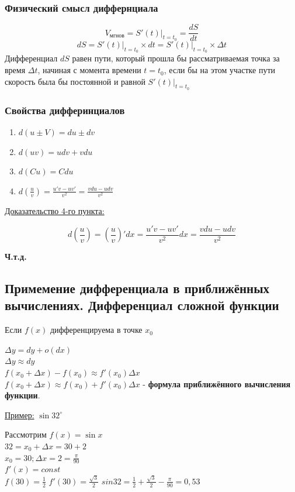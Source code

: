 \documentclass[12pt]{article}
\begin{document}
    \subsubsection*{Физический смысл диффернциала}
    \[V_{\text{мгнов}}=S'(t)\Big|_{t=t_0}=\frac{dS}{dt}\]
    \[ dS = S'(t)\Big|_{t=t_0} \times dt = S'(t)\Big|_{t=t_0} \times \Delta t \]
    Дифференциал $dS$ равен пути, который прошла бы рассматриваемая точка за время $\Delta t$, начиная с момента времени $t=t_0$, если бы на этом участке пути скорость была бы постоянной и равной $S'(t)\Big|_{t=t_0}$
    \subsubsection*{Свойства дифферинциалов}
    \begin{enumerate}
        \item $d(u \pm V)=du \pm dv$
        \item $d(uv)=udv+vdu$
        \item $d(Cu)=Cdu$
        \item $d(\frac{u}{v})=\frac{u'v-uv'}{v^2}=\frac{vdu-udv}{v^2}$
    \end{enumerate} 
    \underline{Доказательство 4-го пункта:}
    \begin{adjustwidth}{1.5em}{1.5em}
        \[d\left(\frac{u}{v}\right)=\left(\frac{u}{v}\right)'dx=\frac{u'v-uv'}{v^2}dx=\frac{vdu-udv}{v^2}\]
        \begin{center}
            \textbf{Ч.т.д.}
        \end{center}
    \end{adjustwidth}
    \subsection{Примемение дифференциала в приближённых вычислениях. Дифференциал сложной функции}
    \noindent Если $f(x)$ дифференцируема в точке $x_0$
    \begin{adjustwidth}{1.5em}{1.5em}
        $\Delta y=dy+o(dx)$\\
        $\Delta y \approx dy$\\
        $f(x_0+\Delta x)-f(x_0) \approx f'(x_0) \Delta x$\\
        $f(x_0+\Delta x) \approx f(x_0)+f'(x_0) \Delta x$ - \textbf{формула приближённого вычисления функции}.
    \end{adjustwidth}
    \underline{Пример:} $\sin 32^\circ$
    \begin{adjustwidth}{1.5em}{1.5em}
        Рассмотрим $f(x)=\sin x$\\
        $32 = x_0+\Delta x=30 + 2$\\
        $x_0=30;\Delta x = 2 = \frac{\pi}{90}$\\
        $f'(x)=const$\\
        $f(30)=\frac{1}{2}$
        $f'(30)=\frac{\sqrt{3}}{2}$
        $sin 32 = \frac{1}{2}+\frac{\sqrt{3}}{2}-\frac{\pi}{90}=0,53$    
    \end{adjustwidth}
\end{document}
